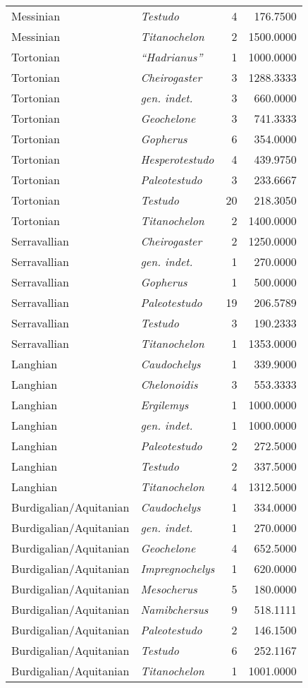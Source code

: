 \begin{longtable}[]{@{}llrr@{}}
	Messinian & \textit{Testudo} & 4 & 176.7500\tabularnewline
	Messinian & \textit{Titanochelon} & 2 & 1500.0000\tabularnewline
	Tortonian & \textit{``Hadrianus''} & 1 & 1000.0000\tabularnewline
	Tortonian & \textit{Cheirogaster} & 3 & 1288.3333\tabularnewline
	Tortonian & \textit{gen. indet.} & 3 & 660.0000\tabularnewline
	Tortonian & \textit{Geochelone} & 3 & 741.3333\tabularnewline
	Tortonian & \textit{Gopherus} & 6 & 354.0000\tabularnewline
	Tortonian & \textit{Hesperotestudo} & 4 & 439.9750\tabularnewline
	Tortonian & \textit{Paleotestudo} & 3 & 233.6667\tabularnewline
	Tortonian & \textit{Testudo} & 20 & 218.3050\tabularnewline
	Tortonian & \textit{Titanochelon} & 2 & 1400.0000\tabularnewline
	Serravallian & \textit{Cheirogaster} & 2 & 1250.0000\tabularnewline
	Serravallian & \textit{gen. indet.} & 1 & 270.0000\tabularnewline
	Serravallian & \textit{Gopherus} & 1 & 500.0000\tabularnewline
	Serravallian & \textit{Paleotestudo} & 19 & 206.5789\tabularnewline
	Serravallian & \textit{Testudo} & 3 & 190.2333\tabularnewline
	Serravallian & \textit{Titanochelon} & 1 & 1353.0000\tabularnewline
	Langhian & \textit{Caudochelys} & 1 & 339.9000\tabularnewline
	Langhian & \textit{Chelonoidis} & 3 & 553.3333\tabularnewline
	Langhian & \textit{Ergilemys} & 1 & 1000.0000\tabularnewline
	Langhian & \textit{gen. indet.} & 1 & 1000.0000\tabularnewline
	Langhian & \textit{Paleotestudo} & 2 & 272.5000\tabularnewline
	Langhian & \textit{Testudo} & 2 & 337.5000\tabularnewline
	Langhian & \textit{Titanochelon} & 4 & 1312.5000\tabularnewline
	Burdigalian/Aquitanian & \textit{Caudochelys} & 1 & 334.0000\tabularnewline
	Burdigalian/Aquitanian & \textit{gen. indet.} & 1 & 270.0000\tabularnewline
	Burdigalian/Aquitanian & \textit{Geochelone} & 4 & 652.5000\tabularnewline
	Burdigalian/Aquitanian & \textit{Impregnochelys} & 1 & 620.0000\tabularnewline
	Burdigalian/Aquitanian & \textit{Mesocherus} & 5 & 180.0000\tabularnewline
	Burdigalian/Aquitanian & \textit{Namibchersus} & 9 & 518.1111\tabularnewline
	Burdigalian/Aquitanian & \textit{Paleotestudo} & 2 & 146.1500\tabularnewline
	Burdigalian/Aquitanian & \textit{Testudo} & 6 & 252.1167\tabularnewline
	Burdigalian/Aquitanian & \textit{Titanochelon} & 1 & 1001.0000\tabularnewline
	\bottomrule
\end{longtable}